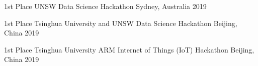 



\begin{cvhonors}
	
	\cvhonor
	{1st Place} %
	{UNSW Data Science Hackathon} %
	{Sydney, Australia} %
	{2019} %

  \cvhonor
    {1st Place} %
    {Tsinghua University and UNSW Data Science Hackathon} %
    {Beijing, China} %
    {2019} %

  \cvhonor
    {1st Place} %
    {Tsinghua University ARM Internet of Things (IoT) Hackathon} %
    {Beijing, China} %
    {2019} %

\end{cvhonors}




 

